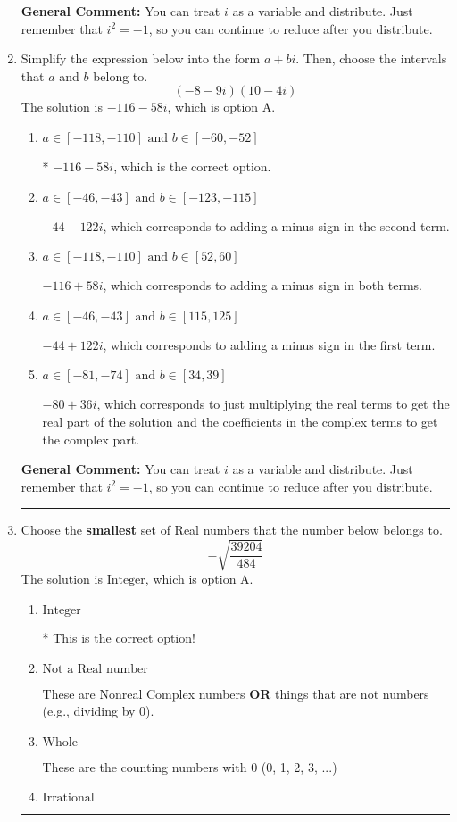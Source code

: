 \documentclass{extbook}[14pt]
\newcommand{\litem}[1]{\item #1

\rule{\textwidth}{0.4pt}}
\begin{document}
\begin{enumerate}
{\textbf{General Comment:} You can treat $i$ as a variable and distribute. Just remember that $i^2=-1$, so you can continue to reduce after you distribute.
}
\litem{
Simplify the expression below into the form $a+bi$. Then, choose the intervals that $a$ and $b$ belong to.
\[ (-8 - 9 i)(10 - 4 i) \]The solution is \( -116 - 58 i \), which is option A.\begin{enumerate}[label=\Alph*.]
\item \( a \in [-118, -110] \text{ and } b \in [-60, -52] \)

* $-116 - 58 i$, which is the correct option.
\item \( a \in [-46, -43] \text{ and } b \in [-123, -115] \)

 $-44 - 122 i$, which corresponds to adding a minus sign in the second term.
\item \( a \in [-118, -110] \text{ and } b \in [52, 60] \)

 $-116 + 58 i$, which corresponds to adding a minus sign in both terms.
\item \( a \in [-46, -43] \text{ and } b \in [115, 125] \)

 $-44 + 122 i$, which corresponds to adding a minus sign in the first term.
\item \( a \in [-81, -74] \text{ and } b \in [34, 39] \)

 $-80 + 36 i$, which corresponds to just multiplying the real terms to get the real part of the solution and the coefficients in the complex terms to get the complex part.
\end{enumerate}

\textbf{General Comment:} You can treat $i$ as a variable and distribute. Just remember that $i^2=-1$, so you can continue to reduce after you distribute.
}
\litem{
Choose the \textbf{smallest} set of Real numbers that the number below belongs to.
\[ -\sqrt{\frac{39204}{484}} \]The solution is \( \text{Integer} \), which is option A.\begin{enumerate}[label=\Alph*.]
\item \( \text{Integer} \)

* This is the correct option!
\item \( \text{Not a Real number} \)

These are Nonreal Complex numbers \textbf{OR} things that are not numbers (e.g., dividing by 0).
\item \( \text{Whole} \)

These are the counting numbers with 0 (0, 1, 2, 3, ...)
\item \( \text{Irrational} \)


\end{enumerate}}
\end{enumerate}
\end{document}
